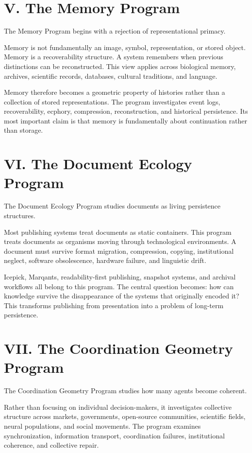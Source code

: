 \documentclass[12pt, openany]{book}
\begin{document}
\section{V. The Memory Program}

The Memory Program begins with a rejection of representational primacy.

Memory is not fundamentally an image, symbol, representation, or stored
object. Memory is a recoverability structure. A system remembers when
previous distinctions can be reconstructed. This view applies across
biological memory, archives, scientific records, databases, cultural
traditions, and language.

Memory therefore becomes a geometric property of histories rather than a
collection of stored representations. The program investigates event logs,
recoverability, ecphory, compression, reconstruction, and historical
persistence. Its most important claim is that memory is fundamentally about
continuation rather than storage.

\section{VI. The Document Ecology Program}

The Document Ecology Program studies documents as living persistence
structures.

Most publishing systems treat documents as static containers. This program
treats documents as organisms moving through technological environments. A
document must survive format migration, compression, copying, institutional
neglect, software obsolescence, hardware failure, and linguistic drift.

Icepick, Marqants, readability-first publishing, snapshot systems, and
archival workflows all belong to this program. The central question becomes:
how can knowledge survive the disappearance of the systems that originally
encoded it? This transforms publishing from presentation into a problem of
long-term persistence.

\section{VII. The Coordination Geometry Program}

The Coordination Geometry Program studies how many agents become coherent.

Rather than focusing on individual decision-makers, it investigates
collective structure across markets, governments, open-source communities,
scientific fields, neural populations, and social movements. The program
examines synchronization, information transport, coordination failures,
institutional coherence, and collective repair.
\end{document}
